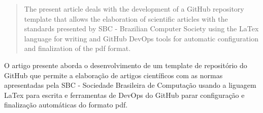 \begin{abstract}
	The present article deals with the development of a GitHub repository template that allows the elaboration of scientific articles with the standards presented by SBC - Brazilian Computer Society using the LaTex language for writing and GitHub DevOps tools for automatic configuration and finalization of the pdf format.
\end{abstract}

\begin{resumo}
	O artigo presente aborda o desenvolvimento de um template de repositório do GitHub que permite a elaboração de artigos científicos com as normas apresentadas pela SBC - Sociedade Brasileira de Computação usando a liguagem LaTex para escrita e ferramentas de DevOps do GitHub parar configuração e finalização automáticas do formato pdf.
\end{resumo}